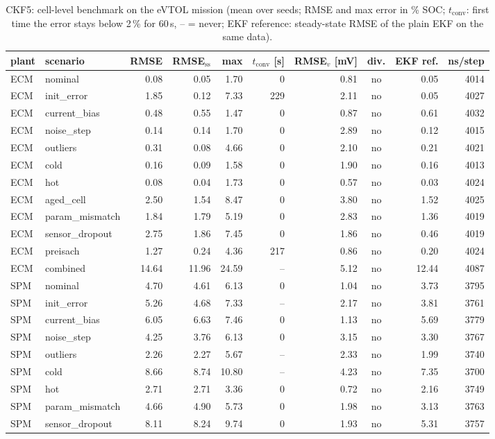 \begin{table}[H]\centering\footnotesize\setlength{\tabcolsep}{4pt}
\caption{CKF5: cell-level benchmark on the eVTOL mission (mean over seeds; RMSE and max error in \% SOC; $t_\mathrm{conv}$: first time the error stays below 2\,\% for 60\,s, -- = never; EKF reference: steady-state RMSE of the plain EKF on the same data).}\label{tab:cell_CKF5}
\begin{tabular}{llrrrrrcrr}\toprule
plant & scenario & RMSE & RMSE$_\mathrm{ss}$ & max & $t_\mathrm{conv}$ [s] & RMSE$_v$ [mV] & div. & EKF ref. & ns/step \\ \midrule
ECM & nominal & 0.08 & 0.05 & 1.70 & 0 & 0.81 & no & 0.05 & 4014 \\
ECM & init\_error & 1.85 & 0.12 & 7.33 & 229 & 2.11 & no & 0.05 & 4027 \\
ECM & current\_bias & 0.48 & 0.55 & 1.47 & 0 & 0.87 & no & 0.61 & 4032 \\
ECM & noise\_step & 0.14 & 0.14 & 1.70 & 0 & 2.89 & no & 0.12 & 4015 \\
ECM & outliers & 0.31 & 0.08 & 4.66 & 0 & 2.10 & no & 0.21 & 4021 \\
ECM & cold & 0.16 & 0.09 & 1.58 & 0 & 1.90 & no & 0.16 & 4013 \\
ECM & hot & 0.08 & 0.04 & 1.73 & 0 & 0.57 & no & 0.03 & 4024 \\
ECM & aged\_cell & 2.50 & 1.54 & 8.47 & 0 & 3.80 & no & 1.52 & 4025 \\
ECM & param\_mismatch & 1.84 & 1.79 & 5.19 & 0 & 2.83 & no & 1.36 & 4019 \\
ECM & sensor\_dropout & 2.75 & 1.86 & 7.45 & 0 & 1.86 & no & 0.46 & 4019 \\
ECM & preisach & 1.27 & 0.24 & 4.36 & 217 & 0.86 & no & 0.20 & 4024 \\
ECM & combined & 14.64 & 11.96 & 24.59 & -- & 5.12 & no & 12.44 & 4087 \\
\midrule
SPM & nominal & 4.70 & 4.61 & 6.13 & 0 & 1.04 & no & 3.73 & 3795 \\
SPM & init\_error & 5.26 & 4.68 & 7.33 & -- & 2.17 & no & 3.81 & 3761 \\
SPM & current\_bias & 6.05 & 6.63 & 7.46 & 0 & 1.13 & no & 5.69 & 3779 \\
SPM & noise\_step & 4.25 & 3.76 & 6.13 & 0 & 3.15 & no & 3.30 & 3767 \\
SPM & outliers & 2.26 & 2.27 & 5.67 & -- & 2.33 & no & 1.99 & 3740 \\
SPM & cold & 8.66 & 8.74 & 10.80 & -- & 4.23 & no & 7.35 & 3700 \\
SPM & hot & 2.71 & 2.71 & 3.36 & 0 & 0.72 & no & 2.16 & 3749 \\
SPM & param\_mismatch & 4.66 & 4.90 & 5.73 & 0 & 1.98 & no & 3.13 & 3763 \\
SPM & sensor\_dropout & 8.11 & 8.24 & 9.74 & 0 & 1.93 & no & 5.31 & 3757 \\
\bottomrule\end{tabular}\end{table}
